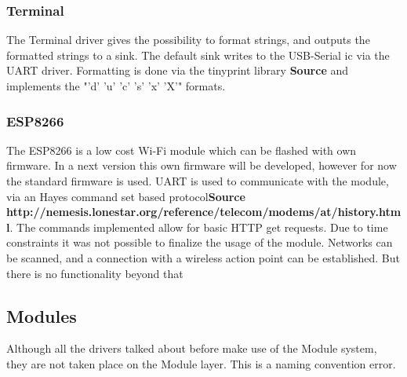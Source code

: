 \subsubsection{Terminal}
The Terminal driver gives the possibility to format strings, and outputs the formatted strings to a sink. The default sink writes to the USB-Serial ic via the UART driver. Formatting is done via the tinyprint library \textbf{Source} and implements the "'d' 'u' 'c' 's' 'x' 'X'" formats.
\subsubsection{ESP8266}
The ESP8266 is a low cost Wi-Fi module which can be flashed with own firmware. In a next version this own firmware will be developed, however for now the standard firmware is used. UART is used to communicate with the module, via an Hayes command set based protocol\textbf{Source http://nemesis.lonestar.org/reference/telecom/modems/at/history.html}. The commands implemented allow for basic HTTP get requests. Due to time constraints it was not possible to finalize the usage of the module. Networks can be scanned, and a connection with a wireless action point can be established. But there is no functionality beyond that
\subsection{Modules}
Although all the drivers talked about before make use of the Module system, they are not taken place on the Module layer. This is a naming convention error.
